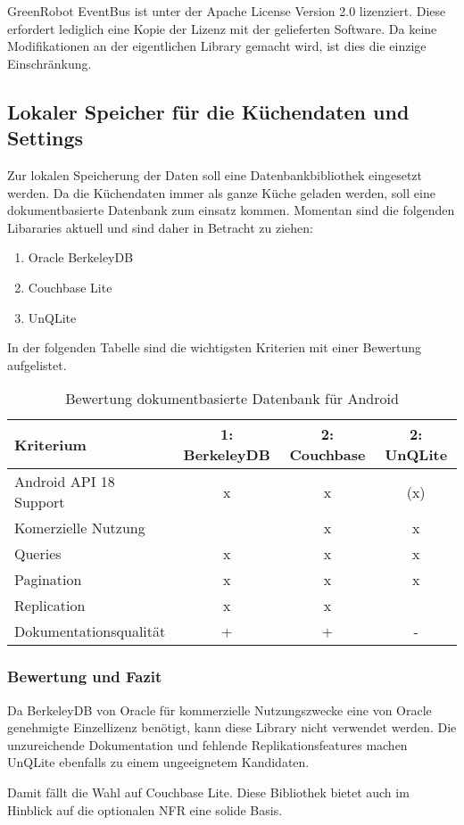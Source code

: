 GreenRobot EventBus ist unter der Apache License \cite{apache_license} Version 2.0  lizenziert. Diese erfordert lediglich eine Kopie der Lizenz mit der gelieferten Software. Da keine Modifikationen an der eigentlichen Library gemacht wird, ist dies die einzige Einschränkung.

\subsection{Lokaler Speicher für die Küchendaten und Settings}
Zur lokalen Speicherung der Daten soll eine Datenbankbibliothek eingesetzt werden. Da die Küchendaten immer als ganze Küche geladen werden, soll eine dokumentbasierte Datenbank zum einsatz kommen. Momentan sind die folgenden Libararies aktuell und sind daher in Betracht zu ziehen:
\begin{enumerate}
\item Oracle BerkeleyDB
\item Couchbase Lite
\item UnQLite
\end{enumerate}

In der folgenden Tabelle sind die wichtigsten Kriterien mit einer Bewertung aufgelistet.

\begin{table}[H]
\begin{tabular}{|p{5cm}|c|c|c|}
 \hline 
\textbf{Kriterium} & \textbf{1: BerkeleyDB} & \textbf{2: Couchbase} & \textbf{2: UnQLite}
\\ \hline

Android API 18 Support & x & x & (x)
\\ \hline
Komerzielle Nutzung    &   & x & x
\\ \hline
Queries                & x & x & x
\\ \hline
Pagination             & x & x & x
\\ \hline
Replication            & x & x & 
\\ \hline
Dokumentationsqualität & + & + & -
\\ \hline
\end{tabular}
\caption{Bewertung dokumentbasierte Datenbank für Android}
\end{table}

\subsubsection{Bewertung und Fazit}
Da BerkeleyDB von Oracle für kommerzielle Nutzungszwecke eine von Oracle genehmigte Einzellizenz benötigt, kann diese Library nicht verwendet werden. Die unzureichende Dokumentation und fehlende Replikationsfeatures machen UnQLite ebenfalls zu einem ungeeignetem Kandidaten.

Damit fällt die Wahl auf Couchbase Lite. Diese Bibliothek bietet auch im Hinblick auf die optionalen \ac{NFR} eine solide Basis.